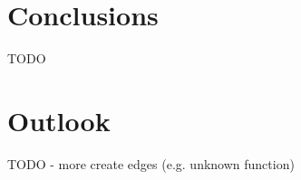 \section{Conclusions}
\label{sec:conclusions}
TODO
\section{Outlook}
\label{sec:outlook}
TODO
- more create edges (e.g. unknown function)